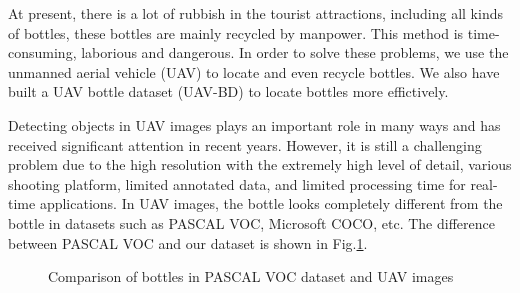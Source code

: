 \label{sec:intro}


At present, there is a lot of rubbish in the tourist attractions, including all kinds of bottles, these bottles are mainly recycled by manpower. This method is time-consuming, laborious and dangerous. In order to solve these problems, we use the unmanned aerial vehicle (UAV) to locate and even recycle bottles. We also have built a UAV bottle dataset (UAV-BD) to locate bottles more effictively.



Detecting objects in UAV images plays an important role in many ways and has received significant attention in recent years\cite{UAV2}. However, it is still a challenging problem due to the high resolution with the extremely high level of detail, various shooting platform, limited annotated data, and limited processing time for real-time applications\cite{car_detection}. In UAV images, the bottle looks completely different from the bottle in datasets such as PASCAL VOC\cite{PASCALVOC}, Microsoft COCO\cite{COCO}, etc. The difference between PASCAL VOC and our dataset is shown in Fig.\ref{bottle_VOC_UAV}.

\begin{figure}
	\centering
	
	\caption{Comparison of bottles in PASCAL VOC dataset and UAV images}
	\label{bottle_VOC_UAV}
\end{figure}

